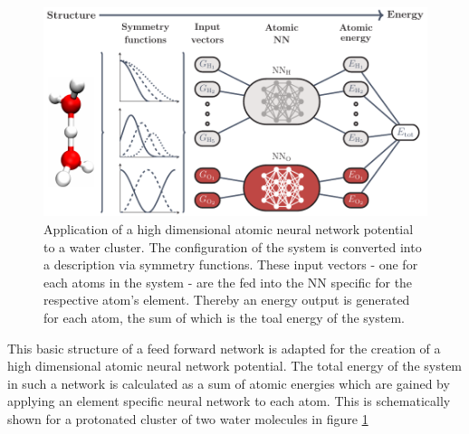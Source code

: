 \documentclass[12pt,titlepage]{article}
\begin{document}
\begin{figure}
	\includegraphics[width=\linewidth]{plot.pdf}
	\caption{Application of a high dimensional atomic neural network potential to a water cluster. The configuration of the system is converted into a description via symmetry functions. These input vectors - one for each atoms in the system - are the fed into the NN specific for the respective atom's element. Thereby an energy output is generated for each atom, the sum of which is the toal energy of the system.}
	\label{application of neural network}
\end{figure}



This basic structure of a feed forward network is adapted for the creation of a high dimensional atomic neural network potential. The total energy of the system in such a network is calculated as a sum of atomic energies which are gained by applying an element specific neural network to each atom. This is schematically shown for a protonated cluster of two water molecules in figure \ref{application of neural network}
\end{document}
